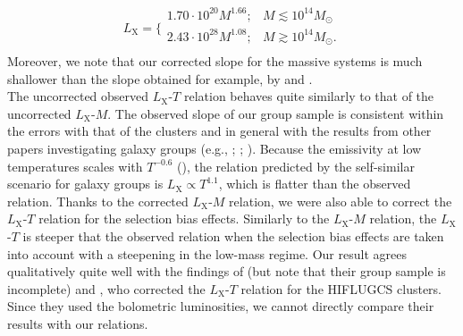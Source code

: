 \documentclass{aa} %
\begin{document}
\begin{equation}
L_{\text{X}} =
\bigg \{
\begin{array}{rl}
1.70\cdot10^{20}M^{1.66}; & M \lesssim  10^{14} M_{\odot} \\
2.43\cdot10^{28}M^{1.08}; & M \gtrsim 	10^{14} M_{\odot}. \\
\end{array}
\end{equation}
Moreover, we note that our corrected slope for the massive systems is much shallower than the slope obtained for example, by \cite{2009A&A...498..361P} and \cite{2010A&A...517A..92A}. \\
The uncorrected observed $L_{\text{X}}$-$T$ relation behaves quite similarly to
that of the uncorrected $L_{\text{X}}$-$M$. The observed slope
of our group sample is consistent within the errors with that of the
clusters and in general with the results from other papers
investigating galaxy groups (e.g., \citealt{2004MNRAS.350.1511O};
\citealt{2009ApJ...690..879S}; \citealt{2011A&A...535A.105E}). Because the emissivity at low temperatures scales with $T^{-0.6}$ (\citealt{1977ApJ...215..213M}), the relation predicted by the self-similar scenario for galaxy groups is $L_{\text{X}}\propto T^{1.1}$, which is flatter than the observed relation. Thanks to the
corrected $L_{\text{X}}$-$M$ relation, we were also able to correct the $L_{\text{X}}$-$T$
relation for
the selection bias effects. Similarly to the $L_{\text{X}}$-$M$ relation, the
$L_{\text{X}}$-$T$ is steeper that the observed relation when the selection bias effects are
taken into account with a steepening in the low-mass regime. Our result agrees qualitatively quite well with the findings of \cite{2011A&A...535A.105E} (but note that their group sample is incomplete) and \cite{2011A&A...532A.133M}, who corrected the $L_{\text{X}}$-$T$
relation for the HIFLUGCS clusters. Since they used the bolometric
luminosities, we cannot directly compare their results with our
relations.
\end{document}
